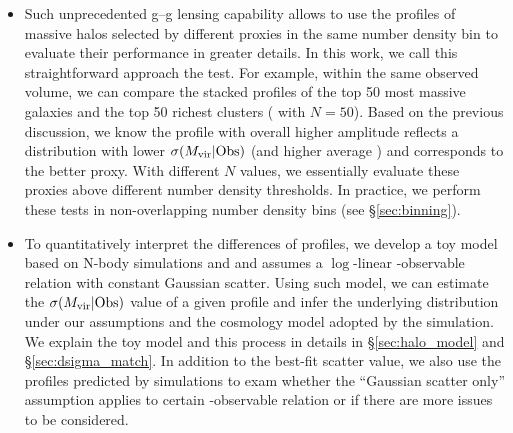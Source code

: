 \documentclass[fleqn,usenatbib,useAMS,english]{mnras}
\begin{document}
\begin{itemize}
        \item Such unprecedented g--g lensing capability allows to use the \dsigma{} profiles of
            massive halos selected by different \mvir{} proxies in the same number density bin to
            evaluate their performance in greater details.
            In this work, we call this straightforward approach the \topn{} test.
            For example, within the same observed volume, we can compare the stacked \dsigma{} 
            profiles of the top 50 most massive galaxies and the top 50 richest clusters
            (\topn{} with $N=50$).
            Based on the previous discussion, we know the \dsigma{} profile with overall higher 
            amplitude reflects a \mvir{} distribution with lower $\sigma(M_{\rm vir} | {\rm Obs})$
            (and higher average \mvir{}) and corresponds to the better \mvir{} proxy.  
            With different $N$ values, we essentially evaluate these \mvir{} proxies above 
            different number density thresholds. 
            In practice, we perform these tests in non-overlapping number density bins 
            (see \S \ref{sec:binning}). 

        \item To quantitatively interpret the differences of \dsigma{} profiles, we 
            develop a toy model based on N-body simulations  and \smdpl{} and assumes a
            $\log$-linear \mvir{}-observable relation with constant Gaussian scatter.
            Using such model, we can estimate the $\sigma(M_{\rm vir} | {\rm Obs})$ value 
            of a given \dsigma{} profile and infer the underlying \mvir{} distribution under our 
            assumptions and the cosmology model adopted by the simulation.
            We explain the toy model and this process in details in \S \ref{sec:halo_model} and 
            \S \ref{sec:dsigma_match}.
            In addition to the best-fit scatter value, we also use the \dsigma{} profiles predicted 
            by simulations to exam whether the ``Gaussian scatter only'' assumption applies to 
            certain \mvir{}-observable relation or if there are more issues to be considered.
        

\end{itemize}
\end{document}
